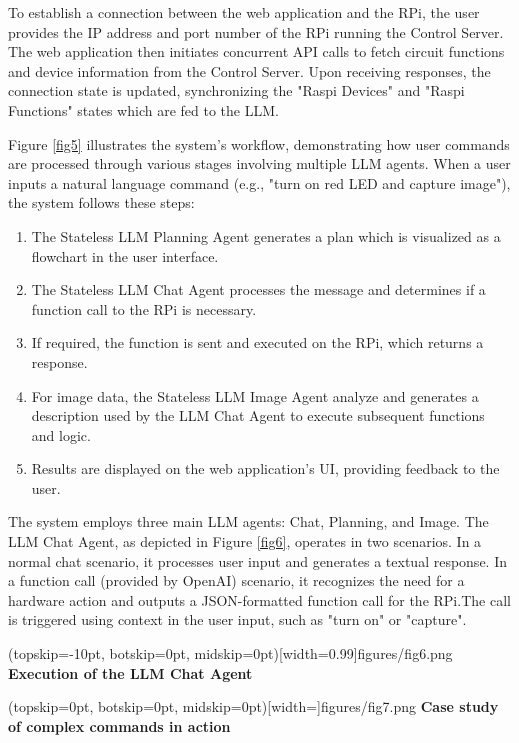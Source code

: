 \documentclass{ieeeaccess}
\begin{document}
To establish a connection between the web application and the RPi, the user provides the IP address and port number of the RPi running the Control Server. The web application then initiates concurrent API calls to fetch circuit functions and device information from the Control Server. Upon receiving responses, the connection state is updated, synchronizing the "Raspi Devices" and "Raspi Functions" states which are fed to the LLM.

Figure \ref{fig5} illustrates the system's workflow, demonstrating how user commands are processed through various stages involving multiple LLM agents. When a user inputs a natural language command (e.g., "turn on red LED and capture image"), the system follows these steps:

\begin{enumerate}
    \item The Stateless LLM Planning Agent generates a plan which is visualized as a flowchart in the user interface.
    \item The Stateless LLM Chat Agent processes the message and determines if a function call to the RPi is necessary.
    \item If required, the function is sent and executed on the RPi, which returns a response.
    \item For image data, the Stateless LLM Image Agent analyze and generates a description used by the LLM Chat Agent to execute subsequent functions and logic.
    \item Results are displayed on the web application's UI, providing feedback to the user.
\end{enumerate}

The system employs three main LLM agents: Chat, Planning, and Image. The LLM Chat Agent, as depicted in Figure \ref{fig6}, operates in two scenarios. In a normal chat scenario, it processes user input and generates a textual response. In a function call (provided by OpenAI) scenario, it recognizes the need for a hardware action and outputs a JSON-formatted function call for the RPi.The call is triggered using context in the user input, such as "turn on" or "capture".

\Figure[h!](topskip=-10pt, botskip=0pt,
midskip=0pt)[width=0.99\columnwidth]{{figures/fig6.png}}
{ \textbf{Execution of the LLM Chat Agent}\label{fig6}}

\Figure[t!](topskip=0pt, botskip=0pt,
midskip=0pt)[width=\textwidth]{{figures/fig7.png}}
{ \textbf{Case study of complex commands in action}\label{fig7}}
\end{document}
